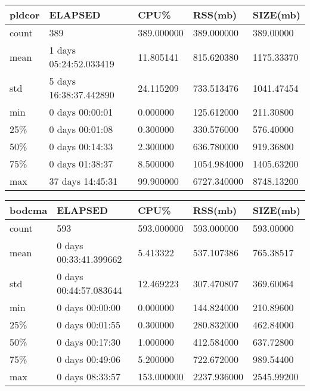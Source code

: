 \documentclass{article}
\begin{document}
\begin{table}[H]
\begin{tabular}{|l|l|l|l|l|}
\hline pldcor& ELAPSED&   CPU\%&  RSS(mb)&   SIZE(mb) \\
\hline count&    389& 389.000000&  389.000000&  389.00000 \\
\hline mean&  1 days 05:24:52.033419&  11.805141&  815.620380& 1175.33370 \\
\hline std&  5 days 16:38:37.442890&  24.115209&  733.513476& 1041.47454 \\
\hline min&   0 days 00:00:01&  0.000000&  125.612000&  211.30800 \\
\hline 25\%&   0 days 00:01:08&  0.300000&  330.576000&  576.40000 \\
\hline 50\%&   0 days 00:14:33&  2.300000&  636.780000&  919.36800 \\
\hline 75\%&   0 days 01:38:37&  8.500000& 1054.984000& 1405.63200 \\
\hline max&  37 days 14:45:31&  99.900000& 6727.340000& 8748.13200 \\
\hline 
\end{tabular}
\label{TABLE-SessionSizepldcor}
\end{table}

\begin{table}[H]
\begin{tabular}{|l|l|l|l|l|}
\hline bodcma& ELAPSED&   CPU\%&  RSS(mb)&   SIZE(mb) \\
\hline count&    593& 593.000000&  593.000000&  593.00000 \\
\hline mean&  0 days 00:33:41.399662&  5.413322&  537.107386&  765.38517 \\
\hline std&  0 days 00:44:57.083644&  12.469223&  307.470807&  369.60064 \\
\hline min&   0 days 00:00:00&  0.000000&  144.824000&  210.89600 \\
\hline 25\%&   0 days 00:01:55&  0.300000&  280.832000&  462.84000 \\
\hline 50\%&   0 days 00:17:30&  1.000000&  412.584000&  637.72800 \\
\hline 75\%&   0 days 00:49:06&  5.200000&  722.672000&  989.54400 \\
\hline max&   0 days 08:33:57& 153.000000& 2237.936000& 2545.99200 \\
\hline 
\end{tabular}
\label{TABLE-SessionSizebodcma}
\end{table}
\end{document}
